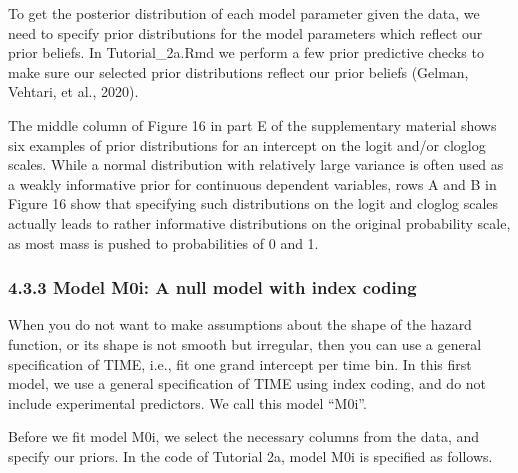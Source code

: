 \documentclass[
  man, donotrepeattitle,floatsintext]{apa6}
\begin{document}
To get the posterior distribution of each model parameter given the data, we need to specify prior distributions for the model parameters which reflect our prior beliefs.
In Tutorial\_2a.Rmd we perform a few prior predictive checks to make sure our selected prior distributions reflect our prior beliefs (Gelman, Vehtari, et al., 2020).

The middle column of Figure 16 in part E of the supplementary material shows six examples of prior distributions for an intercept on the logit and/or cloglog scales. While a normal distribution with relatively large variance is often used as a weakly informative prior for continuous dependent variables, rows A and B in Figure 16 show that specifying such distributions on the logit and cloglog scales actually leads to rather informative distributions on the original probability scale, as most mass is pushed to probabilities of 0 and 1.

\subsubsection{4.3.3 Model M0i: A null model with index coding}\label{model-m0i-a-null-model-with-index-coding}

When you do not want to make assumptions about the shape of the hazard function, or its shape is not smooth but irregular, then you can use a general specification of TIME, i.e., fit one grand intercept per time bin. In this first model, we use a general specification of TIME using index coding, and do not include experimental predictors. We call this model ``M0i''.

Before we fit model M0i, we select the necessary columns from the data, and specify our priors. In the code of Tutorial 2a, model M0i is specified as follows.
\end{document}
